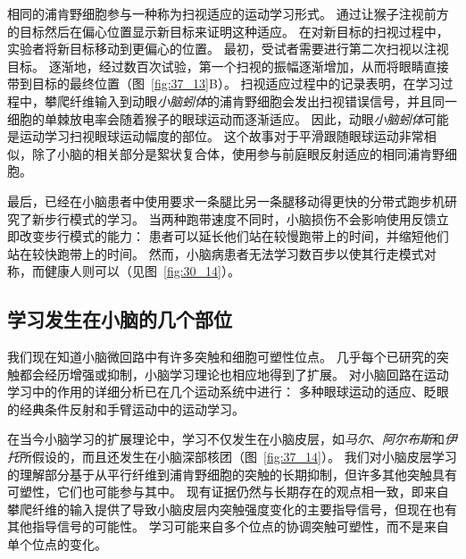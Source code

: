 相同的浦肯野细胞参与一种称为扫视适应的运动学习形式。
通过让猴子注视前方的目标然后在偏心位置显示新目标来证明这种适应。
在对新目标的扫视过程中，实验者将新目标移动到更偏心的位置。
最初，受试者需要进行第二次扫视以注视目标。
逐渐地，经过数百次试验，第一个扫视的振幅逐渐增加，从而将眼睛直接带到目标的最终位置（图~\ref{fig:37_13}B）。
扫视适应过程中的记录表明，在学习过程中，攀爬纤维输入到动眼\textit{小脑蚓体}的浦肯野细胞会发出扫视错误信号，并且同一细胞的单棘放电率会随着猴子的眼球运动而逐渐适应。
因此，动眼\textit{小脑蚓体}可能是运动学习扫视眼球运动幅度的部位。
这个故事对于平滑跟随眼球运动非常相似，除了小脑的相关部分是絮状复合体，使用参与前庭眼反射适应的相同浦肯野细胞。


最后，已经在小脑患者中使用要求一条腿比另一条腿移动得更快的分带式跑步机研究了新步行模式的学习。
当两种跑带速度不同时，小脑损伤不会影响使用反馈立即改变步行模式的能力：
患者可以延长他们站在较慢跑带上的时间，并缩短他们站在较快跑带上的时间。
然而，小脑病患者无法学习数百步以使其行走模式对称，而健康人则可以（见图~\ref{fig:30_14}）。



\subsection{学习发生在小脑的几个部位}

我们现在知道小脑微回路中有许多突触和细胞可塑性位点。
几乎每个已研究的突触都会经历增强或抑制，小脑学习理论也相应地得到了扩展。
对小脑回路在运动学习中的作用的详细分析已在几个运动系统中进行：
多种眼球运动的适应、眨眼的经典条件反射和手臂运动中的运动学习。


在当今小脑学习的扩展理论中，学习不仅发生在小脑皮层，如\textit{马尔}、\textit{阿尔布斯}和\textit{伊托}所假设的，而且还发生在小脑深部核团（图~\ref{fig:37_14}）。
我们对小脑皮层学习的理解部分基于从平行纤维到浦肯野细胞的突触的长期抑制，但许多其他突触具有可塑性，它们也可能参与其中。
现有证据仍然与长期存在的观点相一致，即来自攀爬纤维的输入提供了导致小脑皮层内突触强度变化的主要指导信号，但现在也有其他指导信号的可能性。
学习可能来自多个位点的协调突触可塑性，而不是来自单个位点的变化。



